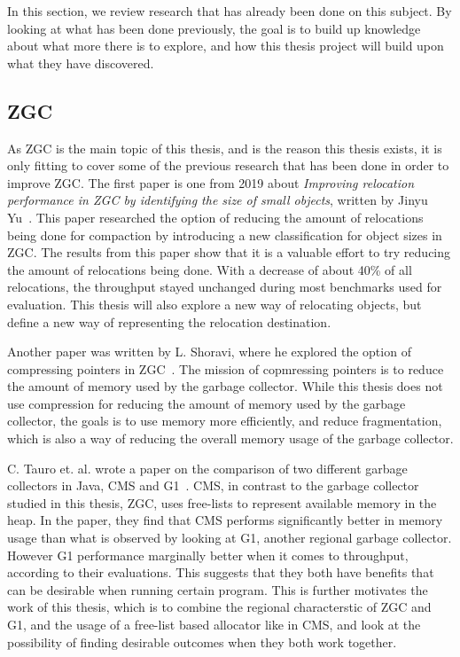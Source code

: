 

In this section, we review research that has already been done on this subject. By looking at what has been done previously, the goal is to build up knowledge about what more there is to explore, and how this thesis project will build upon what they have discovered. 

\subsection{ZGC}
As ZGC is the main topic of this thesis, and is the reason this thesis exists, it is only fitting to cover some of the previous research that has been done in order to improve ZGC. The first paper is one from 2019 about \textit{Improving relocation performance in ZGC by identifying the size of small objects}, written by Jinyu Yu~\cite{TODO:https://www.diva-portal.org/smash/get/diva2:1693010/FULLTEXT01.pdf}. This paper researched the option of reducing the amount of relocations being done for compaction by introducing a new classification for object sizes in ZGC. The results from this paper show that it is a valuable effort to try reducing the amount of relocations being done. With a decrease of about 40\% of all relocations, the throughput stayed unchanged during most benchmarks used for evaluation. This thesis will also explore a new way of relocating objects, but define a new way of representing the relocation destination.

Another paper was written by L. Shoravi, where he explored the option of compressing pointers in ZGC~\cite{TODO:https://www.diva-portal.org/smash/get/diva2:1766097/FULLTEXT01.pdf}. The mission of copmressing pointers is to reduce the amount of memory used by the garbage collector. While this thesis does not use compression for reducing the amount of memory used by the garbage collector, the goals is to use memory more efficiently, and reduce fragmentation, which is also a way of reducing the overall memory usage of the garbage collector.

C. Tauro et. al. wrote a paper on the comparison of two different garbage collectors in Java, CMS and G1~\cite{https://citeseerx.ist.psu.edu/document?repid=rep1&type=pdf&doi=6b97a988da6f82e13ea5fc673c72b463a30b98db}. CMS, in contrast to the garbage collector studied in this thesis, ZGC, uses free-lists to represent available memory in the heap. In the paper, they find that CMS performs significantly better in memory usage than what is observed by looking at G1, another regional garbage collector. However G1 performance marginally better when it comes to throughput, according to their evaluations. This suggests that they both have benefits that can be desirable when running certain program. This is further motivates the work of this thesis, which is to combine the regional characterstic of ZGC and G1, and the usage of a free-list based allocator like in CMS, and look at the possibility of finding desirable outcomes when they both work together.